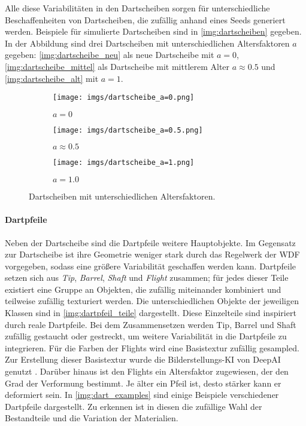 Alle diese Variabilitäten in den Dartscheiben sorgen für unterschiedliche Beschaffenheiten von Dartscheiben, die zufällig anhand eines Seeds generiert werden. Beispiele für simulierte Dartscheiben sind in \autoref{img:dartscheiben} gegeben. In der Abbildung sind drei Dartscheiben mit unterschiedlichen Altersfaktoren $a$ gegeben: \autoref{img:dartscheibe_neu} als neue Dartscheibe mit $a=0$, \autoref{img:dartscheibe_mittel} als Dartscheibe mit mittlerem Alter $a\approx0.5$ und \autoref{img:dartscheibe_alt} mit $a=1$.

\begin{figure}
    \centering
    \begin{subfigure}{0.3\textwidth}
        \centering
        \texttt{[image: imgs/dartscheibe\_a=0.png]}
        \caption{$a=0$}
        \label{img:dartscheibe_neu}
    \end{subfigure}
    \hfill
    \begin{subfigure}{0.3\textwidth}
        \centering
        \texttt{[image: imgs/dartscheibe\_a=0.5.png]}
        \caption{$a\approx0.5$}
        \label{img:dartscheibe_mittel}
    \end{subfigure}
    \hfill
    \begin{subfigure}{0.3\textwidth}
        \centering
        \texttt{[image: imgs/dartscheibe\_a=1.png]}
        \caption{$a=1.0$}
        \label{img:dartscheibe_alt}
    \end{subfigure}
    \caption{Dartscheiben mit unterschiedlichen Altersfaktoren.}
    \label{img:dartscheiben}
\end{figure}

\paragraph{Dartpfeile}
\label{sec:impl:daten:blender:hauptobjekte:dartpfeile}

Neben der Dartscheibe sind die Dartpfeile weitere Hauptobjekte. Im Gegensatz zur Dartscheibe ist ihre Geometrie weniger stark durch das Regelwerk der \ac{WDF} vorgegeben, sodass eine größere Variabilität geschaffen werden kann. Dartpfeile setzen sich aus \textit{Tip}, \textit{Barrel}, \textit{Shaft} und \textit{Flight} zusammen; für jedes dieser Teile existiert eine Gruppe an Objekten, die zufällig miteinander kombiniert und teilweise zufällig texturiert werden. Die unterschiedlichen Objekte der jeweiligen Klassen sind in \autoref{img:dartpfeil_teile} dargestellt. Diese Einzelteile sind inspiriert durch reale Dartpfeile. Bei dem Zusammensetzen werden Tip, Barrel und Shaft zufällig gestaucht oder gestreckt, um weitere Variabilität in die Dartpfeile zu integrieren. Für die Farben der Flights wird eine Basistextur zufällig gesampled. Zur Erstellung dieser Basistextur wurde die Bilderstellungs-KI von DeepAI genutzt \cite{deepai-image}. Darüber hinaus ist den Flights ein Altersfaktor zugewiesen, der den Grad der Verformung bestimmt. Je älter ein Pfeil ist, desto stärker kann er deformiert sein. In \autoref{img:dart_examples} sind einige Beispiele verschiedener Dartpfeile dargestellt. Zu erkennen ist in diesen die zufällige Wahl der Bestandteile und die Variation der Materialien.

